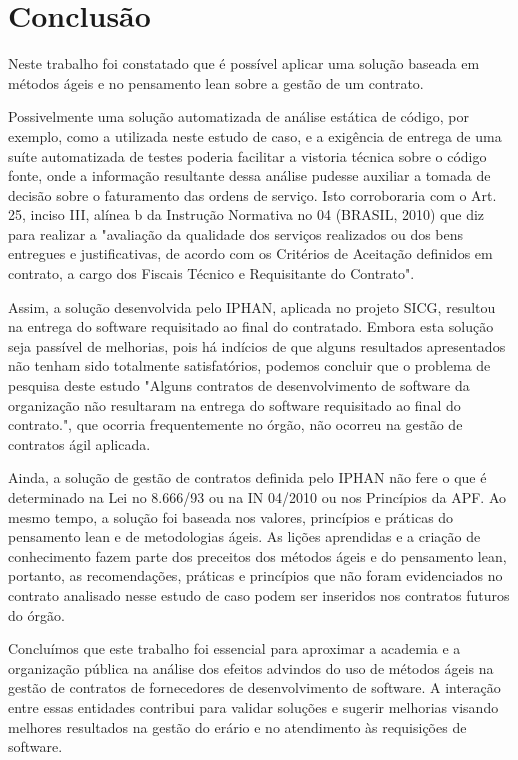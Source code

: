 \section{Conclusão}
\label{sec:conclusao}


Neste trabalho foi constatado que é possível aplicar uma solução baseada em métodos ágeis e no pensamento lean sobre a gestão de um contrato.

Possivelmente uma solução automatizada de análise estática de código, por exemplo, como a utilizada neste estudo de caso, e a exigência de entrega de uma suíte automatizada de testes poderia facilitar a vistoria técnica sobre o
 código fonte, onde a informação resultante dessa análise pudesse auxiliar a tomada de
 decisão sobre o faturamento das ordens de serviço. Isto corroboraria com o Art. 25, inciso III, alínea b da Instrução Normativa no 04 (BRASIL, 2010) que diz para realizar a
 "avaliação da qualidade dos serviços realizados ou dos bens entregues e justificativas, de
 acordo com os Critérios de Aceitação definidos em contrato, a cargo dos Fiscais Técnico
 e Requisitante do Contrato".

Assim, a solução desenvolvida pelo IPHAN, aplicada no projeto SICG, resultou na
 entrega do software requisitado ao final do contratado. Embora esta solução seja passível
 de melhorias, pois há indícios de que alguns resultados apresentados não tenham sido
 totalmente satisfatórios, podemos concluir que o problema de pesquisa deste estudo "Alguns contratos de desenvolvimento de software da organização não resultaram na entrega
 do software requisitado ao final do contrato.", que ocorria frequentemente no órgão, não
 ocorreu na gestão de contratos ágil aplicada.

Ainda, a solução de gestão de contratos definida pelo
 IPHAN não fere o que é determinado na Lei no 8.666/93 ou na IN 04/2010 ou nos Princípios da APF. Ao mesmo tempo, a solução foi baseada nos valores, princípios e práticas
 do pensamento lean e de metodologias ágeis. As lições aprendidas e a criação de conhecimento fazem parte dos preceitos dos métodos ágeis e do pensamento lean, portanto, as
 recomendações, práticas e princípios que não foram evidenciados no contrato analisado
 nesse estudo de caso podem ser inseridos nos contratos futuros do órgão.

Concluímos que este trabalho foi essencial para aproximar a academia e a organização pública na análise dos efeitos advindos do uso de métodos ágeis na gestão de contratos de fornecedores de desenvolvimento de software. A interação entre
essas entidades contribui para validar soluções e sugerir melhorias visando melhores resultados na gestão do erário e no atendimento às requisições de software.